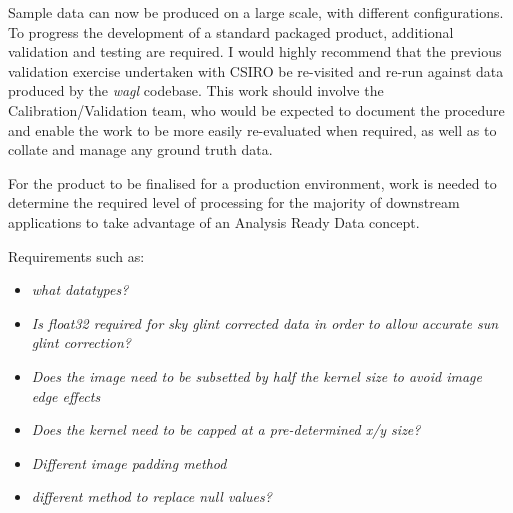 \documentclass[a4paper]{article}
\begin{document}
    \begin{flushleft}
      Sample data can now be produced on a large scale, with different configurations. To progress the development of a standard packaged product, additional validation and testing are required. I would highly recommend that the previous validation exercise undertaken with CSIRO be re-visited and re-run against data produced by the \textit{wagl} codebase. This work should involve the Calibration/Validation team, who would be expected to document the procedure and enable the work to be more easily re-evaluated when required, as well as to collate and manage any ground truth data. \par
      For the product to be finalised for a production environment, work is needed to determine the required level of processing for the majority of downstream applications to take advantage of an Analysis Ready Data concept. \par

      Requirements such as:
    \end{flushleft}

    \begin{itemize}
      \item \footnotesize{\textit{what datatypes?}}
      \item \footnotesize{\textit{Is float32 required for sky glint corrected data in order to allow accurate sun glint correction?}}
      \item \footnotesize{\textit{Does the image need to be subsetted by half the kernel size to avoid image edge effects}}
      \item \footnotesize{\textit{Does the kernel need to be capped at a pre-determined x/y size?}}
      \item \footnotesize{\textit{Different image padding method}}
      \item \footnotesize{\textit{different method to replace null values?}}
    \end{itemize}
\end{document}
